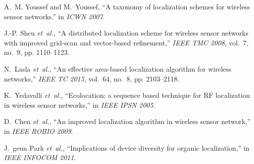 \documentclass[conference]{IEEEtran}
\begin{document}
\begin{thebibliography}{10}
A.~M. Youssef and M.~Youssef, ``A taxonomy of localization schemes for wireless
  sensor networks.'' in \emph{ICWN 2007}.

J.-P. Sheu \emph{et~al.}, ``A distributed localization scheme for wireless
  sensor networks with improved grid-scan and vector-based refinement,''
  \emph{IEEE TMC 2008}, vol.~7, no.~9, pp. 1110--1123.

N.~Lasla \emph{et~al.}, ``An effective area-based localization algorithm for
  wireless networks,'' \emph{IEEE TC 2015}, vol.~64, no.~8, pp. 2103--2118.

K.~Yedavalli \emph{et~al.}, ``Ecolocation: a sequence based technique for {RF}
  localization in wireless sensor networks,'' in \emph{IEEE IPSN 2005}.

D.~Chen \emph{et~al.}, ``An improved localization algorithm in wireless sensor
  network,'' in \emph{IEEE ROBIO 2009}.

J.~geun Park \emph{et~al.}, ``Implications of device diversity for organic
  localization,'' in \emph{IEEE INFOCOM 2011}.

\end{thebibliography}
\end{document}
